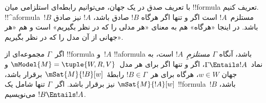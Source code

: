 \documentclass[../../../include/open-logic-section]{subfiles}
\begin{document}


\begin{explain}
  با تعریف صدق در یک جهان، می‌توانیم رابطه‌ای استلزامی میان !!{formula}
  تعریف کنیم. !!^a{formula}~$!B$ مستلزم~$!A$ است اگر و تنها اگر هرگاه
  $!B$ صادق باشد، $!A$ نیز صادق باشد. در اینجا «هرگاه» هم به معنای
  «هر مدلی را که در نظر بگیریم» است و هم «هر جهانی از آن مدل را که در
  نظر بگیریم».
\end{explain}

\begin{defn}
  اگر~$\Gamma$ مجموعه‌ای از !!{formula} و~$!A$ !!a{formula} باشد، آنگاه
  $\Gamma$ \emph{مستلزمِ}~$!A$ است، به نماد~$\Gamma \Entails !A$، اگر
  و تنها اگر برای هر مدل~$\mModel{M} = \tuple{W, R, V}$ و جهان
  $w \in W$، هرگاه برای هر~$!B \in \Gamma$ رابطهٔ~$\mSat{M}{!B}[w]$
  برقرار باشد، $\mSat{M}{!A}[w]$ نیز برقرار باشد. اگر~$\Gamma$ تنها
  شامل یک !!{formula}~$!B$ باشد، $!B \Entails !A$ می‌نویسیم.
\end{defn}
\end{document}
